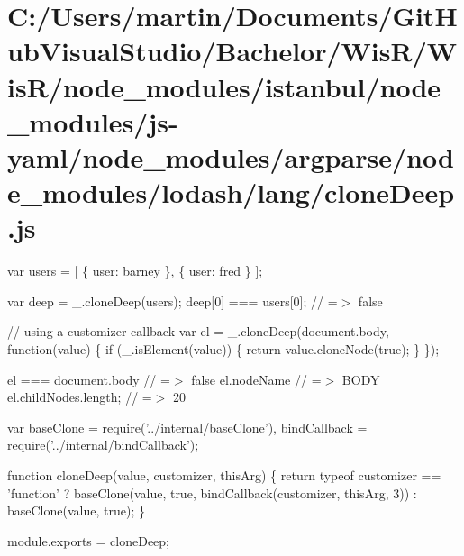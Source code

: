 \hypertarget{_c_1_2_users_2martin_2_documents_2_git_hub_visual_studio_2_bachelor_2_wis_r_2_wis_r_2node_modulefd1acf0c48ee2a338bb1349107fbb9a1}{}\section{C\+:/\+Users/martin/\+Documents/\+Git\+Hub\+Visual\+Studio/\+Bachelor/\+Wis\+R/\+Wis\+R/node\+\_\+modules/istanbul/node\+\_\+modules/js-\/yaml/node\+\_\+modules/argparse/node\+\_\+modules/lodash/lang/clone\+Deep.\+js}
var users = \mbox{[} \{ \textquotesingle{}user\textquotesingle{}\+: \textquotesingle{}barney\textquotesingle{} \}, \{ \textquotesingle{}user\textquotesingle{}\+: \textquotesingle{}fred\textquotesingle{} \} \mbox{]};

var deep = \+\_\+.\+clone\+Deep(users); deep\mbox{[}0\mbox{]} === users\mbox{[}0\mbox{]}; // =$>$ false

// using a customizer callback var el = \+\_\+.\+clone\+Deep(document.\+body, function(value) \{ if (\+\_\+.\+is\+Element(value)) \{ return value.\+clone\+Node(true); \} \});

el === document.\+body // =$>$ false el.\+node\+Name // =$>$ B\+O\+D\+Y el.\+child\+Nodes.\+length; // =$>$ 20


\begin{DoxyCodeInclude}
var baseClone = require(\textcolor{stringliteral}{'../internal/baseClone'}),
    bindCallback = require(\textcolor{stringliteral}{'../internal/bindCallback'});

\textcolor{keyword}{function} cloneDeep(value, customizer, thisArg) \{
  \textcolor{keywordflow}{return} typeof customizer == \textcolor{stringliteral}{'function'}
    ? baseClone(value, \textcolor{keyword}{true}, bindCallback(customizer, thisArg, 3))
    : baseClone(value, true);
\}

module.exports = cloneDeep;
\end{DoxyCodeInclude}
 